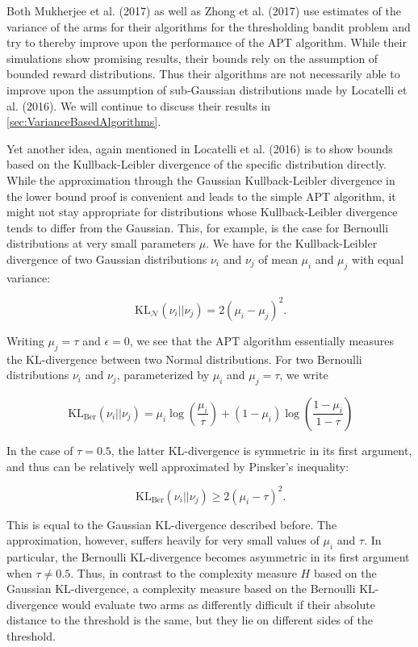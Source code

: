 \documentclass[11pt,]{article}
\newcommand{\KL}{\,\text{KL}}
\begin{document}
Both Mukherjee et al. (2017) as well as Zhong et al. (2017) use
estimates of the variance of the arms for their algorithms for the
thresholding bandit problem and try to thereby improve upon the
performance of the APT algorithm. While their simulations show promising
results, their bounds rely on the assumption of bounded reward
distributions. Thus their algorithms are not necessarily able to improve
upon the assumption of sub-Gaussian distributions made by Locatelli et
al. (2016). We will continue to discuss their results in
\autoref{sec:VarianceBasedAlgorithms}.

Yet another idea, again mentioned in Locatelli et al. (2016) is to show
bounds based on the Kullback-Leibler divergence of the specific
distribution directly. While the approximation through the Gaussian
Kullback-Leibler divergence in the lower bound proof is convenient and
leads to the simple APT algorithm, it might not stay appropriate for
distributions whose Kullback-Leibler divergence tends to differ from the
Gaussian. This, for example, is the case for Bernoulli distributions at
very small parameters \(\mu\). We have for the Kullback-Leibler
divergence of two Gaussian distributions \(\nu_i\) and \(\nu_j\) of mean
\(\mu_i\) and \(\mu_j\) with equal variance:

\[
\KL_{\mathcal{N}}(\nu_i || \nu_j) = 2(\mu_i - \mu_j)^2.
\]

Writing \(\mu_j = \tau\) and \(\epsilon = 0\), we see that the APT
algorithm essentially measures the KL-divergence between two Normal
distributions. For two Bernoulli distributions \(\nu_i\) and \(\nu_j\),
parameterized by \(\mu_i\) and \(\mu_j=\tau\), we write

\[
\KL_{\text{Ber}}(\nu_i||\nu_j) = \mu_i \log(\frac{\mu_i}{\tau}) + (1-\mu_i) \log(\frac{1-\mu_i}{1-\tau})
\]

In the case of \(\tau = 0.5\), the latter KL-divergence is symmetric in
its first argument, and thus can be relatively well approximated by
Pinsker's inequality:

\[
\KL_{\text{Ber}}(\nu_i||\nu_j) \geq 2(\mu_i - \tau)^2.
\]

This is equal to the Gaussian KL-divergence described before. The
approximation, however, suffers heavily for very small values of
\(\mu_i\) and \(\tau\). In particular, the Bernoulli KL-divergence
becomes asymmetric in its first argument when \(\tau \neq 0.5\). Thus,
in contrast to the complexity measure \(H\) based on the Gaussian
KL-divergence, a complexity measure based on the Bernoulli KL-divergence
would evaluate two arms as differently difficult if their absolute
distance to the threshold is the same, but they lie on different sides
of the threshold.
\end{document}
